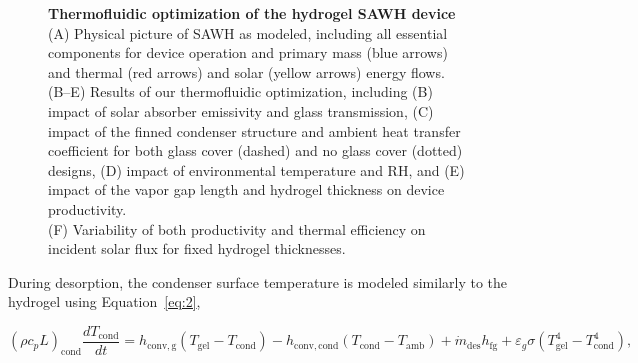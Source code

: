 \documentclass[11pt]{article}
\begin{document}
\begin{figure}[t]
\centering
{}
\caption{\textbf{Thermofluidic optimization of the hydrogel SAWH device} \\
(A) Physical picture of SAWH as modeled, including all essential components for device operation and primary mass (blue arrows) and thermal (red arrows) and solar (yellow arrows) energy flows. \\
(B--E) Results of our thermofluidic optimization, including (B) impact of solar absorber emissivity and glass transmission, (C) impact of the finned condenser structure and ambient heat transfer coefficient for both glass cover (dashed) and no glass cover (dotted) designs, (D) impact of environmental temperature and RH, and (E) impact of the vapor gap length and hydrogel thickness on device productivity. \\
(F) Variability of both productivity and thermal efficiency on incident solar flux for fixed hydrogel thicknesses.}
\label{fig:fig2}
\end{figure}

During desorption, the condenser surface temperature is modeled similarly to the hydrogel using Equation~\ref{eq:2},

\begin{equation}
\left(\rho c_p L\right)_{\mathrm{cond}} \frac{dT_{\mathrm{cond}}}{dt} = h_{\mathrm{conv,g}}\left(T_{\mathrm{gel}} - T_{\mathrm{cond}}\right) - h_{\mathrm{conv,cond}}\left(T_{\mathrm{cond}} - T_{\mathrm{amb}}\right) + \dot{m}_{\mathrm{des}} h_{\mathrm{fg}} + \varepsilon_g \sigma \left(T_{\mathrm{gel}}^4 - T_{\mathrm{cond}}^4\right),
\label{eq:2}
\end{equation}
\end{document}
